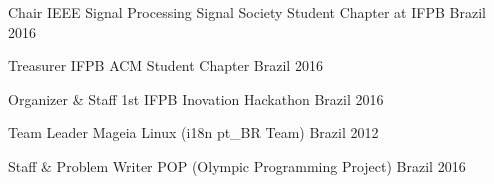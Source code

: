 

\begin{cvhonors}

  \cvhonor
    {Chair} %
    {IEEE Signal Processing Signal Society Student Chapter at IFPB} %
    {Brazil} %
    {2016} %

  \cvhonor
    {Treasurer} %
    {IFPB ACM Student Chapter} %
    {Brazil} %
    {2016} %

  \cvhonor
    {Organizer \& Staff} %
    {1st IFPB Inovation Hackathon} %
    {Brazil} %
    {2016} %

  \cvhonor
    {Team Leader} %
    {Mageia Linux (i18n pt\_BR Team)} %
    {Brazil} %
    {2012} %

  \cvhonor
    {Staff \& Problem Writer} %
    {POP (Olympic Programming Project)} %
    {Brazil} %
    {2016} %

\end{cvhonors}
